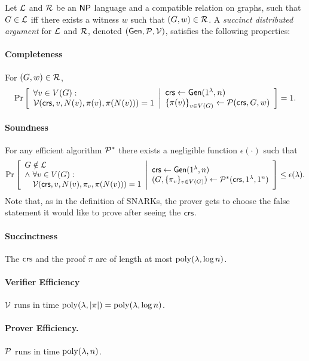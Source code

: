 
\begin{definition}\label{defSDarg}
Let $\mathcal{L}$ and $\mathcal{R}$ be an ${\mathsf{NP}}$ language and a compatible relation on graphs,
such that $G \in \mathcal{L}$ iff there exists a witness $w$ such that $(G,w) \in \mathcal{R}$.
A \emph{succinct distributed argument} for $\mathcal{L}$ and $\mathcal{R}$, denoted $(\mathsf{Gen}, \mathcal{P}, \mathcal{V})$, satisfies the following properties:
\paragraph{Completeness}  For $(G,w)\in \mathcal{R}$,
\begin{gather*}
    \Pr \left[ \begin{array}{ll} 
    	\forall v \in V(G):\\
	    \mathcal{V}(\mathsf{crs}, v, N(v), \pi(v), \pi(N(v))) = 1
	 \end{array} \middle\vert \begin{array}{ll} 
    \mathsf{crs} \leftarrow \mathsf{Gen}(1^\lambda, n) \\
    \left \{{ \pi(v) } \right \}_{v\in V(G)} \leftarrow \mathcal{P}(\mathit{ \mathsf{crs} }, G, w)
     \end{array} \right]
    = 1
    .
\end{gather*}
\paragraph{Soundness}
For any efficient algorithm $\mathcal{P}^*$ %
there exists a negligible function $\epsilon(\cdot)$ such that
\begin{gather*}
    \underset{}{\text{Pr}}\left [
    \begin{array}{ll}
    G\notin \mathcal{L} \\
    \wedge\ \forall v\in V(G) :\\
    \quad \mathcal{V}(\mathit{ \mathsf{crs} }, v, N(v), \pi_{v}, \pi(N(v))) = 1
    \end{array}
    \middle\vert
    \begin{array}{ll}
    \mathit{ \mathsf{crs} } \leftarrow \mathsf{Gen}(1^\lambda, n) \\
    ( G, \{\pi_{v}\}_{v\in V(G)}) \leftarrow \mathcal{P}^*(\mathit{ \mathsf{crs} }, 1^\lambda, 1^n) \\
    \end{array}
    \right ] \leq \epsilon(\lambda)
    .
\end{gather*}
Note that, as in the definition of SNARKs, the prover gets
to choose the false statement it would like to prove after seeing the $\mathsf{crs}$.

\paragraph{Succinctness} The $\mathit{ \mathsf{crs} }$ and the proof $\pi$ are of length at most $\operatorname{poly}(\lambda, \log n)$.
\paragraph{Verifier Efficiency} $\mathcal{V}$ runs in time $\operatorname{poly}(\lambda, |\pi|) = \operatorname{poly}(\lambda, \log n)$.
\paragraph{Prover Efficiency.} $\mathcal{P}$ runs in time $\operatorname{poly}(\lambda, n)$.
\end{definition}

